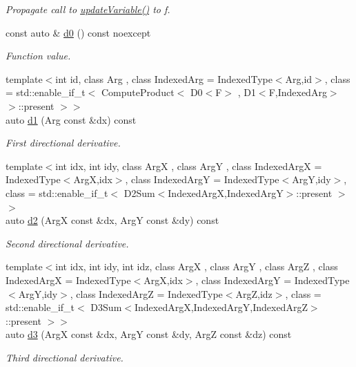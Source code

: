 \begin{DoxyCompactItemize}
\begin{DoxyCompactList}\small\item\em Propagate call to \hyperlink{structFunG_1_1MathematicalOperations_1_1Squared_aed9b2c4a562bf0349044c9f79dcae078}{update\-Variable()} to f. \end{DoxyCompactList}\item 
\hypertarget{structFunG_1_1MathematicalOperations_1_1Squared_a1befce58c84eac92ab7afa974ecaf5b0}{const auto \& \hyperlink{structFunG_1_1MathematicalOperations_1_1Squared_a1befce58c84eac92ab7afa974ecaf5b0}{d0} () const noexcept}\label{structFunG_1_1MathematicalOperations_1_1Squared_a1befce58c84eac92ab7afa974ecaf5b0}

\begin{DoxyCompactList}\small\item\em Function value. \end{DoxyCompactList}\item 
{\footnotesize template$<$int id, class Arg , class Indexed\-Arg  = Indexed\-Type$<$\-Arg,id$>$, class  = std\-::enable\-\_\-if\-\_\-t$<$ Compute\-Product$<$ D0$<$\-F$>$ , D1$<$\-F,\-Indexed\-Arg$>$ $>$\-::present $>$$>$ }\\auto \hyperlink{structFunG_1_1MathematicalOperations_1_1Squared_a02f17b7976e0f72e15bc73d1ae905988}{d1} (Arg const \&dx) const 
\begin{DoxyCompactList}\small\item\em First directional derivative. \end{DoxyCompactList}\item 
{\footnotesize template$<$int idx, int idy, class Arg\-X , class Arg\-Y , class Indexed\-Arg\-X  = Indexed\-Type$<$\-Arg\-X,idx$>$, class Indexed\-Arg\-Y  = Indexed\-Type$<$\-Arg\-Y,idy$>$, class  = std\-::enable\-\_\-if\-\_\-t$<$ D2\-Sum$<$\-Indexed\-Arg\-X,\-Indexed\-Arg\-Y$>$\-::present $>$$>$ }\\auto \hyperlink{structFunG_1_1MathematicalOperations_1_1Squared_a6c9ad9c73006afa6bbe7bc5a5144e18d}{d2} (Arg\-X const \&dx, Arg\-Y const \&dy) const 
\begin{DoxyCompactList}\small\item\em Second directional derivative. \end{DoxyCompactList}\item 
{\footnotesize template$<$int idx, int idy, int idz, class Arg\-X , class Arg\-Y , class Arg\-Z , class Indexed\-Arg\-X  = Indexed\-Type$<$\-Arg\-X,idx$>$, class Indexed\-Arg\-Y  = Indexed\-Type$<$\-Arg\-Y,idy$>$, class Indexed\-Arg\-Z  = Indexed\-Type$<$\-Arg\-Z,idz$>$, class  = std\-::enable\-\_\-if\-\_\-t$<$ D3\-Sum$<$\-Indexed\-Arg\-X,\-Indexed\-Arg\-Y,\-Indexed\-Arg\-Z$>$\-::present $>$$>$ }\\auto \hyperlink{structFunG_1_1MathematicalOperations_1_1Squared_aa792ae543edf0c6288e4acac81b5e007}{d3} (Arg\-X const \&dx, Arg\-Y const \&dy, Arg\-Z const \&dz) const 
\begin{DoxyCompactList}\small\item\em Third directional derivative. \end{DoxyCompactList}\end{DoxyCompactItemize}


